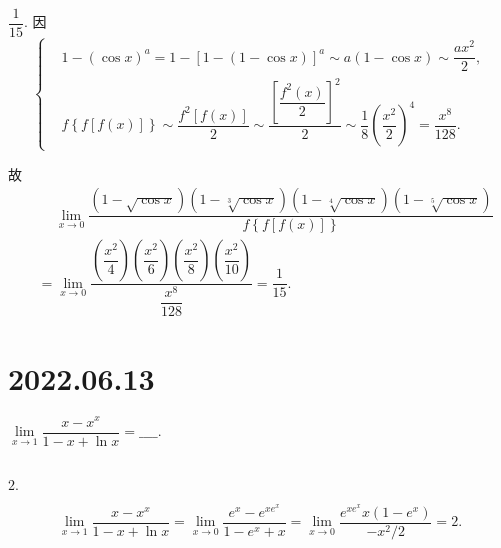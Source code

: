 \documentclass[lang=cn,12pt]{elegantbook}
\begin{document}
\begin{solution}
  $\dfrac{1}{15}.$ 
  因 $$\begin{cases}
    &1- \left(\cos x\right)^a = 1 - \left[1-\left(1-\cos x\right)\right]^a 
      \sim a(1-\cos x) \sim \dfrac{ax^2}{2},\\
    &f\left\{f\left[f\left(x\right)\right]\right\} \sim 
      \dfrac{f^2\left[f\left(x\right)\right]}{2} \sim
      \dfrac{\left[\dfrac{f^2\left(x\right)}{2}\right]^2}{2}\sim 
      \dfrac{1}{8}\left(\dfrac{x^2}{2}\right)^4 = \dfrac{x^8}{128}.
  \end{cases}$$

  故 $$\begin{aligned}
    &\quad \ \lim\limits_{x \to 0} 
      \dfrac{\left(1-\sqrt{\cos x}\right)\left(1-\sqrt[3]{\cos x}\right)
      \left(1-\sqrt[4]{\cos x}\right)\left(1-\sqrt[5]{\cos x}\right)}
      {f\left\{f\left[f\left(x\right)\right]\right\}} \\
    &= \lim\limits_{x \to 0} \dfrac{\left(\dfrac{x^2}{4}\right)\left(\dfrac{x^2}{6}\right)
    \left(\dfrac{x^2}{8}\right)\left(\dfrac{x^2}{10}\right)}
    {\dfrac{x^8}{128}}=\dfrac{1}{15}.
  \end{aligned}$$

\end{solution}


\section*{2022.06.13}

$\lim\limits_{x \to 1} \dfrac{x - x^x}{1 - x + \ln x} = \_\_\_\_.$
\\ \\

\begin{solution}
  $2.$

  $$\lim\limits_{x \to 1} \dfrac{x - x^x}{1 - x + \ln x}
  = \lim\limits_{x \to 0} \dfrac{e^x - e^{x e^x}}{1 - e^x + x}
  = \lim\limits_{x \to 0} \dfrac{e^{x e^x}x(1 - e^x)}{-x^2/2}
  = 2.
  $$

\end{solution}
\end{document}
